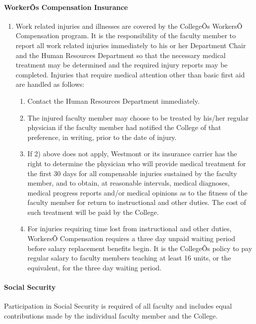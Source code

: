 \documentclass[letterpaper, 11pt]{article}
\begin{document}
			\paragraph{WorkerÕs Compensation Insurance}
				\begin{enumerate}[label=\alph*)]
					\item{Work related injuries and illnesses are covered by the CollegeÕs WorkersÕ Compensation program.  It is the responsibility of the faculty member to report all work related injuries immediately to his or her Department Chair and the Human Resources Department so that the necessary medical treatment may be determined and the required injury reports may be completed. Injuries that require medical attention other than basic first aid are handled as follows:
						\begin{enumerate}[label=\arabic*)]
							\item{Contact the Human Resources Department immediately.}
							\item{The injured faculty member may choose to be treated by his/her regular physician if the faculty member had notified the College of that preference, in writing, prior to the date of injury.}
							\item{If 2) above does not apply, Westmont or its insurance carrier has the right to determine the physician who will provide medical treatment for the first 30 days for all compensable injuries sustained by the faculty member, and to obtain, at reasonable intervals, medical diagnoses, medical progress reports and/or medical opinions as to the fitness of the faculty member for return to instructional and other duties.  The cost of such treatment will be paid by the College.}
							\item{For injuries requiring time lost from instructional and other duties, WorkersÕ Compensation requires a three day unpaid waiting period before salary replacement benefits begin.  It is the CollegeÕs policy to pay regular salary to faculty members teaching at least 16 units, or the equivalent, for the three day waiting period.}
						\end{enumerate}
					}
				\end{enumerate}
			\paragraph{Social Security}
				Participation in Social Security is required of all faculty and includes equal contributions made by the individual faculty member and the College.
\end{document}
